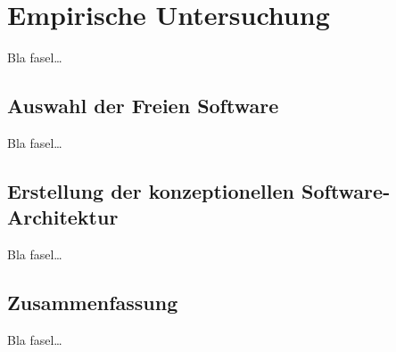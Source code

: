 
\chapter{Empirische Untersuchung}
\label{ch:Untersuchung}
Bla fasel\ldots

\section{Auswahl der Freien Software}
\label{ch:Untersuchung:sec:AuswahlDerFreienSoftware}

Bla fasel\ldots

\section{Erstellung der konzeptionellen Software-Architektur}
\label{ch:Untersuchung:sec:ErstellungSWArchitektur}

Bla fasel\ldots

\section{Zusammenfassung}
\label{ch:Untersuchung:sec:Zusammenfassung}

Bla fasel\ldots

